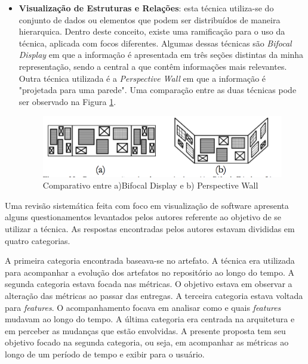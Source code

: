 \begin{itemize}
\item \textbf{Visualização de Estruturas e Relações}: esta técnica utiliza-se do conjunto de dados ou elementos que podem ser distribuídos de maneira hierarquica. Dentro deste conceito, existe uma ramificação para o uso da técnica, aplicada com focos diferentes. Algumas dessas técnicas são \textit{Bifocal Display} em que a informação é apresentada em três seções distintas da minha representação, sendo a central a que contêm informações mais relevantes. Outra técnica utilizada é a \textit{Perspective Wall} em que a informação é "projetada para uma parede". Uma comparação entre as duas técnicas pode ser observado na Figura \ref{img:comparativo}.
\graphicspath{{figuras/}}
\begin{figure}[h]
\centering
\includegraphics[scale=0.5]{Bifocal_Wall}
\caption{Comparativo entre a)Bifocal Display e b) Perspective Wall}
\label{img:comparativo}
\end{figure}
%
\end{itemize}
Uma revisão sistemática feita com foco em visualização de software \cite{salameh_software_2016} apresenta alguns questionamentos levantados pelos autores referente ao objetivo de se utilizar a técnica. As respostas encontradas pelos autores estavam divididas em quatro categorias. 

A primeira categoria encontrada baseava-se no artefato. A técnica era utilizada para acompanhar a evolução dos artefatos no repositório ao longo do tempo. A segunda categoria estava focada nas métricas. O objetivo estava em observar a alteração das métricas ao passar das entregas. A terceira categoria estava voltada para \textit{features}. O acompanhamento focava em analisar como e quais \textit{features} mudavam ao longo do tempo. A última categoria era centrada na arquitetura e em perceber as mudanças que estão envolvidas. A presente proposta tem seu objetivo focado na segunda categoria, ou seja, em acompanhar as métricas ao longo de um período de tempo e exibir para o usuário.

